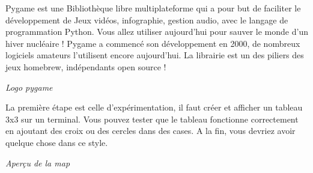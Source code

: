\documentclass[a4paper]{article}
\begin{document}
\newpage
{}

\vspace*{0.5cm}

\setlength{\parindent}{10ex}

\vspace*{1cm}

\setlength{\parindent}{3ex}Pygame est une Bibliothèque libre multiplateforme qui a pour but de faciliter le développement de Jeux vidéos, infographie, gestion audio, avec le langage de programmation Python. Vous allez utiliser aujourd’hui pour sauver le monde d’un hiver nucléaire !
Pygame a commencé son développement en 2000, de nombreux logiciels amateurs l’utilisent encore aujourd’hui. La librairie est un des piliers des jeux homebrew, indépendants open source !


\begin {center}
\textit{Logo pygame}
\end {center}

\vspace*{1cm}

\setlength{\parindent}{10ex} 

\vspace*{1cm}
\setlength{\parindent}{3ex}La première étape est celle d’expérimentation, il faut créer et afficher un tableau 3x3 sur un terminal. Vous pouvez tester que le tableau fonctionne correctement en ajoutant des croix ou des cercles dans des cases. A la fin, vous devriez avoir quelque chose dans ce style.

\vspace*{1cm}

\begin {center}
\textit{Aperçu de la map}
\end {center}

\vspace*{1cm}

\newpage

\setlength{\parindent}{10ex}
\end{document}

